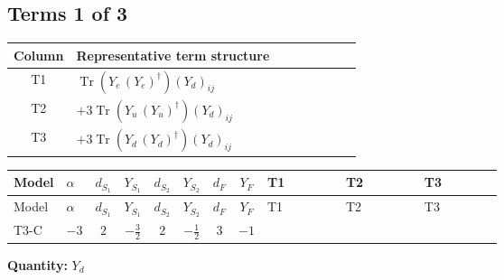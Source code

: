 \documentclass[8pt]{article}
\begin{document}
\begin{landscape}
\subsection*{Terms 1 of 3}
\begin{center}
\begin{tabular}{@{}c >{\raggedright\arraybackslash}p{0.82\linewidth}@{}}
\toprule
Column & Representative term structure \\
\midrule
T1 & \(\displaystyle \operatorname{Tr}\!\left({Y_e}\,\left({Y_e}\right)^{\dagger}\right) \left({Y_d}\right)_{ij}\) \\
\midrule
T2 & \(\displaystyle +3 \operatorname{Tr}\!\left({Y_u}\,\left({Y_u}\right)^{\dagger}\right) \left({Y_d}\right)_{ij}\) \\
\midrule
T3 & \(\displaystyle +3 \operatorname{Tr}\!\left({Y_d}\,\left({Y_d}\right)^{\dagger}\right) \left({Y_d}\right)_{ij}\) \\
\midrule
\bottomrule
\end{tabular}
\end{center}
\smallskip
\tiny
\begin{longtable}{@{}llcccccc >{\raggedright\arraybackslash}p{0.21\linewidth} >{\raggedright\arraybackslash}p{0.21\linewidth} >{\raggedright\arraybackslash}p{0.21\linewidth}@{}}
\toprule
Model & $\alpha$ & $d_{S_1}$ & $Y_{S_1}$ & $d_{S_2}$ & $Y_{S_2}$ & $d_F$ & $Y_F$ & T1 & T2 & T3 \\
\midrule
\endfirsthead
\toprule
Model & $\alpha$ & $d_{S_1}$ & $Y_{S_1}$ & $d_{S_2}$ & $Y_{S_2}$ & $d_F$ & $Y_F$ & T1 & T2 & T3 \\
\midrule
\endhead
T3-C & $-3$ & $2$ & $-\frac{3}{2}$ & $2$ & $-\frac{1}{2}$ & $3$ & $-1$ & \scriptsize\adjustbox{max width=\linewidth}{$\begin{gathered} \operatorname{Tr}\!\left({Y_e}\,\left({Y_e}\right)^{\dagger}\right) \left({Y_d}\right)_{ij}\end{gathered}$} & \scriptsize\adjustbox{max width=\linewidth}{$\begin{gathered} +3 \operatorname{Tr}\!\left({Y_u}\,\left({Y_u}\right)^{\dagger}\right) \left({Y_d}\right)_{ij}\end{gathered}$} & \scriptsize\adjustbox{max width=\linewidth}{$\begin{gathered} +3 \operatorname{Tr}\!\left({Y_d}\,\left({Y_d}\right)^{\dagger}\right) \left({Y_d}\right)_{ij}\end{gathered}$} \\
\midrule
\bottomrule
\end{longtable}
\clearpage
\noindent\textbf{Quantity: }$Y_d$\par\smallskip

\end{landscape}
\end{document}

